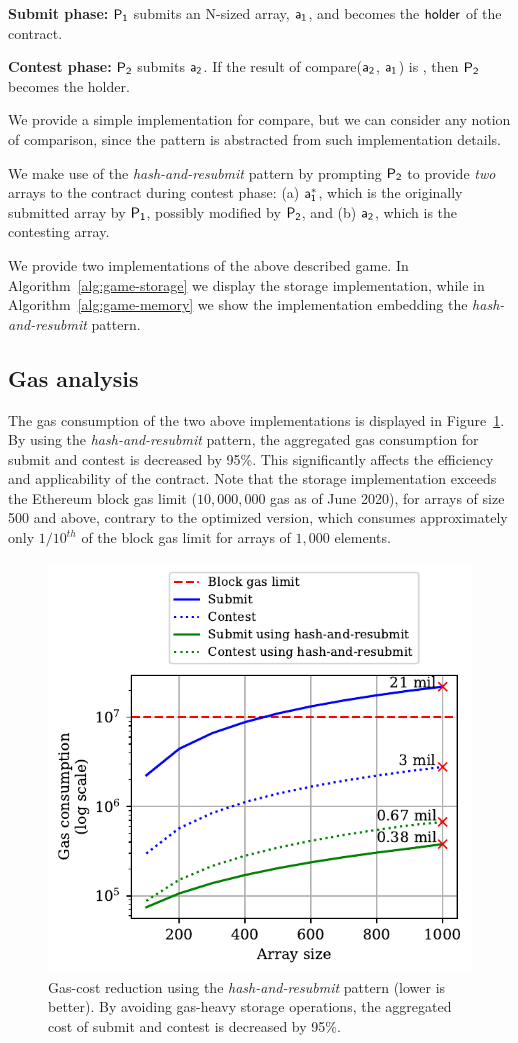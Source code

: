 \noindent\textbf{Submit phase:} $\mathsf{P_1}$ submits an N-sized array, $\mathsf{a_1}$, and
becomes the $\mathsf{holder}$ of the contract.

\noindent\textbf{Contest phase:} $\mathsf{P_2}$ submits $\mathsf{a_2}$. If the result of
\textsf{compare}($\mathsf{a_2}$, $\mathsf{a_1}$) is \true, then $\mathsf{P_2}$ becomes the holder.



We provide a simple implementation for \textsf{compare}, but we can consider
any notion of comparison, since the pattern is abstracted from such
implementation details.

We make use of the \emph{hash-and-resubmit} pattern by prompting $\mathsf{P_2}$ to
provide \emph{two} arrays to the contract during contest phase: (a) $\mathsf{a_1^*}$,
which is the originally submitted array by $\mathsf{P_1}$, possibly modified by $\mathsf{P_2}$,
and (b) $\mathsf{a_2}$, which is the contesting array.

We provide two implementations of the above described game.
In Algorithm~\ref{alg:game-storage} we display the storage implementation,
while in Algorithm~\ref{alg:game-memory} we show the implementation
embedding the \emph{hash-and-resubmit} pattern.


\subsection{Gas analysis} The gas consumption of the two above
implementations is displayed in Figure~\ref{fig:har-example}. By using the
\emph{hash-and-resubmit} pattern, the aggregated gas consumption for
\textsf{submit} and \textsf{contest} is decreased by 95\%. This significantly
affects the efficiency and applicability of the contract. Note that the storage
implementation exceeds the Ethereum block gas limit ($10{,}000{,}000$ gas as of
June 2020), for arrays of size 500 and above, contrary to the optimized
version, which consumes approximately only $1/10^{th}$ of the block gas limit
for arrays of $1{,}000$ elements.

\begin{figure}[!h]
\begin{center}
\includegraphics[width=0.6 \columnwidth]{figures/har-example.pdf}
\end{center}
\caption{Gas-cost reduction using the \emph{hash-and-resubmit} pattern (lower
is better). By avoiding gas-heavy storage operations, the aggregated cost of
\textsf{submit} and \textsf{contest} is decreased by 95\%.}
\label{fig:har-example}
\end{figure}

